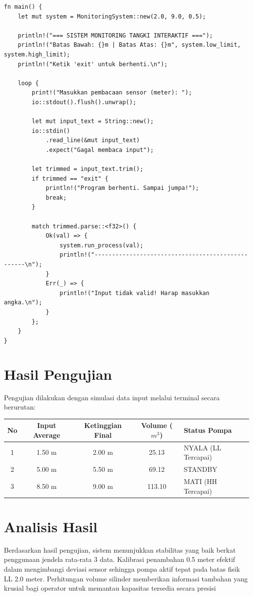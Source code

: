 \documentclass[12pt,a4paper]{article}
\begin{document}
\begin{lstlisting}[style=ruststyle, caption=Implementasi Sistem Monitoring Sensor dan Kendali Pompa Interaktif dengan Rust]
fn main() {
    let mut system = MonitoringSystem::new(2.0, 9.0, 0.5); 
    
    println!("=== SISTEM MONITORING TANGKI INTERAKTIF ===");
    println!("Batas Bawah: {}m | Batas Atas: {}m", system.low_limit, system.high_limit);
    println!("Ketik 'exit' untuk berhenti.\n");

    loop {
        print!("Masukkan pembacaan sensor (meter): ");
        io::stdout().flush().unwrap();

        let mut input_text = String::new();
        io::stdin()
            .read_line(&mut input_text)
            .expect("Gagal membaca input");

        let trimmed = input_text.trim();
        if trimmed == "exit" {
            println!("Program berhenti. Sampai jumpa!");
            break;
        }

        match trimmed.parse::<f32>() {
            Ok(val) => {
                system.run_process(val);
                println!("--------------------------------------------------\n");
            }
            Err(_) => {
                println!("Input tidak valid! Harap masukkan angka.\n");
            }
        };
    }
}
\end{lstlisting}

\section{Hasil Pengujian}
Pengujian dilakukan dengan simulasi data input melalui terminal secara berurutan:
\begin{table}[h]
\centering
\begin{tabular}{|c|c|c|c|l|}
\hline
\textbf{No} & \textbf{Input Average} & \textbf{Ketinggian Final} & \textbf{Volume ($m^3$)} & \textbf{Status Pompa} \\ \hline
1 & 1.50 m & 2.00 m & 25.13 & NYALA (LL Tercapai) \\ \hline
2 & 5.00 m & 5.50 m & 69.12 & STANDBY \\ \hline
3 & 8.50 m & 9.00 m & 113.10 & MATI (HH Tercapai) \\ \hline
\end{tabular}
\end{table}

\section{Analisis Hasil}
Berdasarkan hasil pengujian, sistem menunjukkan stabilitas yang baik berkat penggunaan jendela rata-rata 3 data. Kalibrasi penambahan 0.5 meter efektif dalam mengimbangi deviasi sensor sehingga pompa aktif tepat pada batas fisik LL 2.0 meter. Perhitungan volume silinder memberikan informasi tambahan yang krusial bagi operator untuk memantau kapasitas tersedia secara presisi
\end{document}
